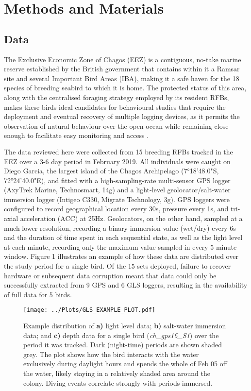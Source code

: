 \documentclass[11pt]{article}
\begin{document}
    
    \section{Methods and Materials}

    \subsection{Data}
    The Exclusive Economic Zone of Chagos (EEZ) is a contiguous, no-take marine reserve established by the British government that contains within it a Ramsar site and several Important Bird Areas (IBA), making it a safe haven for the 18 species of breeding seabird to which it is home. The protected status of this area, along with the centralised foraging strategy employed by its resident RFBs, makes these birds ideal candidates for behavioural studies that require the deployment and eventual recovery of multiple logging devices, as it permits the observation of natural behaviour over the open ocean while remaining close enough to facilitate easy monitoring and access \citep{einoder2009review}.
    
    The data reviewed here were collected from 15 breeding RFBs tracked in the EEZ over a 3-6 day period in February 2019. All individuals were caught on Diego Garcia, the largest island of the Chagos Archipelago (7°18'48.0"S, 72°24'40.0"E), and fitted with a high-sampling-rate multi-sensor GPS logger (AxyTrek Marine, Technosmart, 14g) and a light-level geolocator/salt-water immersion logger (Intigeo C330, Migrate Technology, 3g). GPS loggers were configured to record geographical location every 30s, pressure every 1s, and tri-axial acceleration (ACC) at 25Hz. Geolocators, on the other hand, sampled at a much lower resolution, recording a binary immersion value (wet/dry) every 6s and the duration of time spent in each sequential state, as well as the light level at each minute, recording only the maximum value sampled in every 5 minute window. Figure 1 illustrates an example of how these data are distributed over the study period for a single bird. Of the 15 sets deployed, failure to recover hardware or subsequent data corruption meant that data could only be successfully extracted from 9 GPS and 6 GLS loggers, resulting in the availability of full data for 5 birds.
    
    \begin{figure}[t!]
	    \centering\texttt{[image: ../Plots/GLS\_EXAMPLE\_PLOT.pdf]}
	    \caption{Example distribution of \textbf{a)} light level data; \textbf{b)} salt-water immersion data; and \textbf{c)} depth data for a single bird (\emph{ch\_gps16\_S1}) over the period it was tracked. Dark (night-time) periods are shown shaded grey. The plot shows how the bird interacts with the water exclusively during daylight hours and spends the whole of Feb 05 off the water, likely staying in a relatively shaded area around the colony. Diving events correlate strongly with periods immersed.}
    \end{figure}
    
\end{document}
